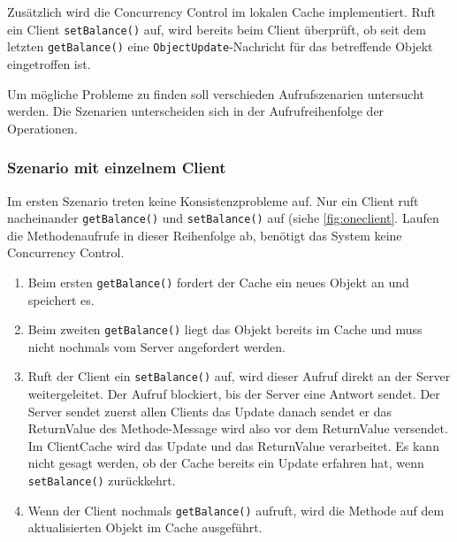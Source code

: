 Zusätzlich wird die Concurrency Control im lokalen Cache implementiert. Ruft ein Client \texttt{setBalance()} auf, wird bereits beim Client überprüft, ob seit dem letzten \texttt{getBalance()} eine \texttt{ObjectUpdate}-Nachricht für das betreffende Objekt eingetroffen ist. 

Um mögliche Probleme zu finden soll verschieden Aufrufszenarien untersucht werden. Die Szenarien unterscheiden sich in der Aufrufreihenfolge der Operationen.

\subsubsection{Szenario mit einzelnem Client}
\label{sec:mogl-aufr}

Im ersten Szenario treten keine Konsistenzprobleme auf. Nur ein Client ruft nacheinander \texttt{getBalance()} und \texttt{setBalance()} auf (siehe \ref{fig:oneclient}. Laufen die Methodenaufrufe in dieser Reihenfolge ab, benötigt das System keine Concurrency Control.

\begin{enumerate}
\item Beim ersten \verb|getBalance()| fordert der Cache ein neues Objekt an und speichert es.
\item Beim zweiten \verb|getBalance()|  liegt das Objekt bereits im Cache und muss nicht nochmals vom Server angefordert werden.
\item Ruft der Client ein \verb|setBalance()| auf, wird dieser Aufruf direkt an der Server weitergeleitet. Der Aufruf blockiert, bis der Server eine Antwort sendet. Der Server sendet zuerst allen Clients das Update danach sendet er das ReturnValue des Methode-Message wird also vor dem ReturnValue versendet. Im ClientCache wird das Update und das ReturnValue verarbeitet. Es kann nicht gesagt werden, ob der Cache bereits ein Update erfahren hat, wenn  \verb|setBalance()|  zurückkehrt.
\item Wenn der Client nochmals \texttt{getBalance()} aufruft, wird die Methode auf dem aktualisierten Objekt im Cache ausgeführt.
\end{enumerate}

